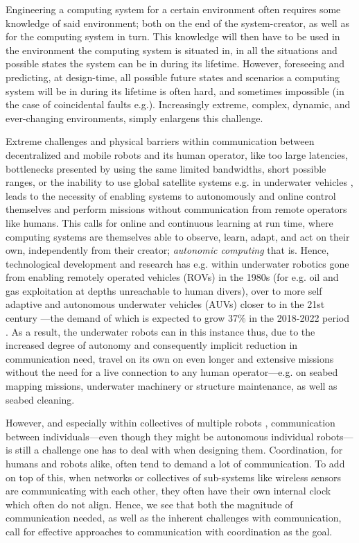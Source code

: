 Engineering a computing system for a certain environment often requires some knowledge of said environment; both on the end of the system-creator, as well as for the computing system in turn. This knowledge will then have to be used in the environment the computing system is situated in, in all the situations and possible states the system can be in during its lifetime. However, foreseeing and predicting, at design-time, all possible future states and scenarios a computing system will be in during its lifetime is often hard, and sometimes impossible (in the case of coincidental faults e.g.). Increasingly extreme, complex, dynamic, and ever-changing environments, simply enlargens this challenge.

Extreme challenges and physical barriers within communication between decentralized and mobile robots and its human operator, like too large latencies, bottlenecks presented by using the same limited bandwidths, short possible ranges, or the inability to use global satellite systems e.g. in underwater vehicles \cite{petillot_underwater_robots}, leads to the necessity of enabling systems to autonomously and online control themselves and perform missions without communication from remote operators like humans. This calls for online and continuous learning at run time, where computing systems are themselves able to observe, learn, adapt, and act on their own, independently from their creator; \textit{autonomic computing} that is. Hence, technological development and research has e.g. within underwater robotics gone from enabling remotely operated vehicles (ROVs) in the 1980s (for e.g. oil and gas exploitation at depths unreachable to human divers), over to more self adaptive and autonomous underwater vehicles (AUVs) closer to in the 21st century —the demand of which is expected to grow 37\% in the 2018-2022 period \cite{petillot_underwater_robots}. As a result, the underwater robots can in this instance thus, due to the increased degree of autonomy and consequently implicit reduction in communication need, travel on its own on even longer and extensive missions without the need for a live connection to any human operator—e.g. on seabed mapping missions, underwater machinery or structure maintenance, as well as seabed cleaning.


However, and especially within collectives of multiple robots \cite{cocoro, swarm_bot}, communication between individuals—even though they might be autonomous individual robots—is still a challenge one has to deal with when designing them. Coordination, for humans and robots alike, often tend to demand a lot of communication. To add on top of this, when networks or collectives of sub-systems like wireless sensors are communicating with each other, they often have their own internal clock which often do not align. Hence, we see that both the magnitude of communication needed, as well as the inherent challenges with communication, call for effective approaches to communication with coordination as the goal.

